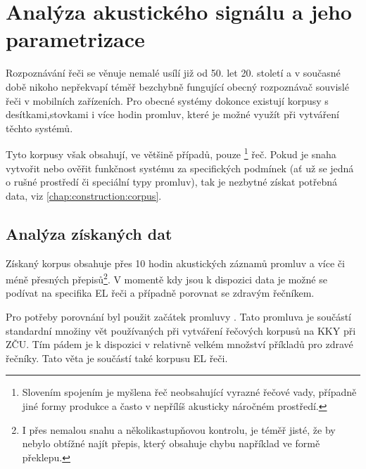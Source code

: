 \section{Analýza akustického signálu a jeho parametrizace}
\label{chap:construction:analysis}

Rozpoznávání řeči se věnuje nemalé usílí již od 50. let 20. století a v současné době nikoho nepřekvapí téměř bezchybně fungující obecný rozpoznávač souvislé řeči v mobilních zařízeních. Pro obecné systémy dokonce existují korpusy s desítkami,stovkami i více hodin promluv, které je možné využít při vytváření těchto systémů.

Tyto korpusy však obsahují, ve většině případů, pouze \footnote{Slovením spojením  je myšlena řeč neobsahující vyrazné řečové vady, případně jiné formy produkce a často v nepřílíš akusticky náročném prostředí.} řeč. Pokud je snaha vytvořit nebo ověřit funkčnost systému za specifických podmínek (ať už se jedná o rušné prostředí či speciální typy promluv), tak je nezbytné získat potřebná data, viz \ref{chap:construction:corpus}.

\subsection{Analýza získaných dat}
\label{chap:construction:analysis:data}

Získaný korpus obsahuje přes 10 hodin akustických záznamů promluv a více či méně přesných přepisů\footnote{I přes nemalou snahu a několikastupňovou kontrolu, je téměř jisté, že by nebylo obtížné najít přepis, který obsahuje chybu například ve formě překlepu.}. V momentě kdy jsou k dispozici data je možné se podívat na specifika EL řeči a případně porovnat se zdravým řečníkem.

Pro potřeby porovnání byl použit začátek promluvy \textit{}. Tato promluva je součástí standardní množiny vět používaných při vytváření řečových korpusů na KKY při ZČU. Tím pádem je k dispozici v relativně velkém množství příkladů pro zdravé řečníky. Tato věta je součástí také korpusu EL řeči.

